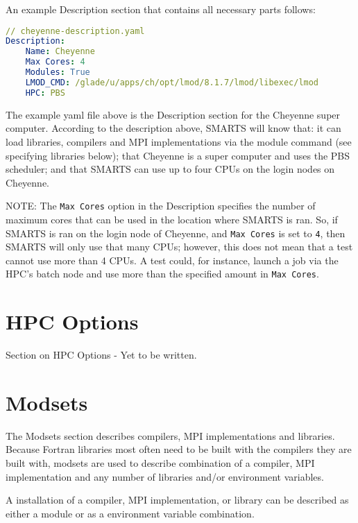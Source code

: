 An example Description section that contains all necessary parts follows:

\begin{lstlisting}[language=yaml, 
                   caption={Examlpe Cheyenne Environment.yaml Description},
                   label=cheyenne_desc_example]
// cheyenne-description.yaml
Description:
    Name: Cheyenne
    Max Cores: 4
    Modules: True
    LMOD_CMD: /glade/u/apps/ch/opt/lmod/8.1.7/lmod/libexec/lmod
    HPC: PBS
\end{lstlisting}

The example yaml file above is the Description section for the Cheyenne super
computer. According to the description above, SMARTS will know that: it can
load libraries, compilers and MPI implementations via the module command (see
specifying libraries below); that Cheyenne is a super computer and uses the PBS
scheduler; and that SMARTS can use up to four CPUs on the login nodes on
Cheyenne.

NOTE: The {\tt Max Cores} option in the Description specifies the number of
maximum cores that can be used in the location where SMARTS is ran. So, if
SMARTS is ran on the login node of Cheyenne, and {\tt Max Cores} is set to
{\tt 4}, then SMARTS will only use that many CPUs; however, this does not mean
that a test cannot use more than 4 CPUs. A test could, for instance, launch a
job via the HPC's batch node and use more than the specified amount in {\tt Max
Cores}.

\section{HPC Options}
\label{sec:hpc_options}

Section on HPC Options - Yet to be written.

\section{Modsets}
\label{sec:modsets}

The Modsets section describes compilers, MPI implementations and libraries.
Because Fortran libraries most often need to be built with the compilers they
are built with, modsets are used to describe combination of a compiler, MPI
implementation and any number of libraries and/or environment variables.

A installation of a compiler, MPI implementation, or library can be described
as either a module or as a environment variable combination. 

